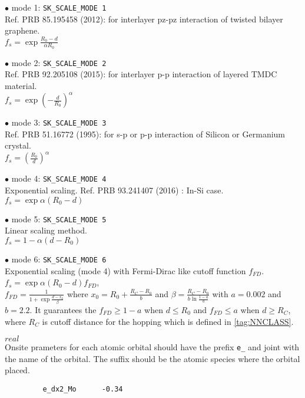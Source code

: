 \documentclass[a4paper,12pt]{scrartcl}
\makeatletter
\def\namedlabel#1#2{\begingroup
    #2%
    \def\@currentlabel{#2}%
    \phantomsection\label{#1}\endgroup
}
\newcommand{\textgreen}[1]{\textcolor{green!50!black}{\texttt{#1}}}
\makeatother
\begin{document}
\begin{description}
		\item $\bullet$ mode 1: \texttt{SK\_SCALE\_MODE 1} \\
		 Ref. PRB 85.195458 (2012): for interlayer pz-pz interaction of twisted bilayer graphene. \\
		  $f_s = \exp{ \frac{R_0 - d}{\alpha R_0} }$ 
		\item $\bullet$ mode 2: \texttt{SK\_SCALE\_MODE 2} \\
		 Ref. PRB 92.205108 (2015): for interlayer p-p interaction of layered TMDC material. \\
		  $f_s = \exp{ (-\frac{d}{R_0})^\alpha }$ 
		\item $\bullet$ mode 3: \texttt{SK\_SCALE\_MODE 3} \\
		 Ref. PRB 51.16772 (1995): for s-p or p-p interaction of Silicon or Germanium crystal. \\
		  $f_s = (\frac{R_0}{d})^\alpha$ 
		\item $\bullet$ mode 4: \texttt{SK\_SCALE\_MODE 4} \\
		 Exponential scaling. Ref. PRB 93.241407 (2016) : In-Si case. \\
		  $f_s = \exp \alpha({R_0 - d})$ 
		\item $\bullet$ mode 5: \texttt{SK\_SCALE\_MODE 5} \\
		 Linear scaling method. \\
		  $f_s = 1 - \alpha (d - R_0)$ 
		\item $\bullet$ mode 6: \texttt{SK\_SCALE\_MODE 6} \\
	     Exponential scaling (mode 4) with Fermi-Dirac like cutoff function $f_{FD}$. \\
		  $f_s = \exp \alpha({R_0 - d}) f_{FD}$, \\
		  $f_{FD} = \frac{1}{1+\exp{\frac{d-x_0}{\beta}}}$ where $x_0=R_0 + \frac{R_C-R_0}{b}$ and 
		  $\beta=\frac{R_C-R_0}{b \ln\frac{1-a}{a}}$ with $a=0.002$ and $b=2.2 $. 
		  It guarantees the $f_{FD} \geq 1-a$ when $d \leq R_0$ and $f_{FD} \leq a$ when $d \geq R_C$, where $R_C$ is cutoff distance for the hopping which is defined in \ref{tag:NNCLASS}.
		  
    \item[\namedlabel{tag:param-onsite}{ONSITE parameters}] $real$ \\
		Onsite prameters for each atomic orbital should have the prefix
		\textgreen{e\_} and joint with the name of the orbital. The suffix
		should be the atomic species where the orbital placed.
        \begin{verbatim}
         e_dx2_Mo      -0.34
        \end{verbatim}


\end{description}
\end{document}

